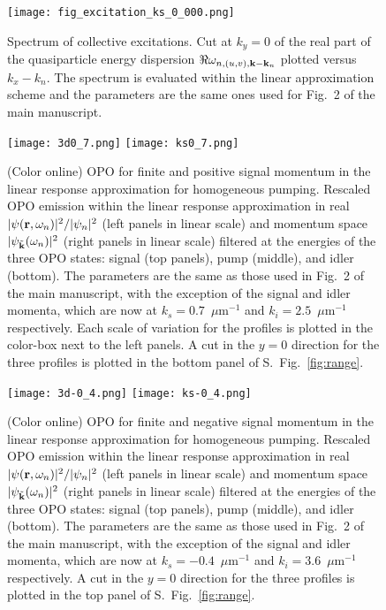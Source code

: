 %
\begin{figure}[h!]
\texttt{[image: fig\_excitation\_ks\_0\_000.png]}
\caption{Spectrum of collective excitations. Cut at $k_y=0$ of the
  real part of the quasiparticle energy dispersion $\Re
  \omega_{n,(u,v),{\mathbf k}-{\mathbf k}_n}$ plotted versus $k_x -
  k_n$. The spectrum is evaluated within the linear approximation
  scheme and the parameters are the same ones used for Fig.~2 of the
  main manuscript.}
\label{fig:bogol}
\end{figure}
%
%
\begin{figure}[h!]
\centering
\texttt{[image: 3d0\_7.png]}
\texttt{[image: ks0\_7.png]}
\caption{(Color online) OPO for finite and positive signal momentum in
  the linear response approximation for homogeneous pumping. Rescaled
  OPO emission within the linear response approximation in real $|\psi
  ({\mathbf r},\omega_n)|^2/|\psi_n|^2$ (left panels in linear scale) and
  momentum space $|\psi_{\tilde{{\mathbf k}}} (\omega_n)|^2$ (right
  panels in linear scale) filtered at the energies of the three OPO
  states: signal (top panels), pump (middle), and idler (bottom). The
  parameters are the same as those used in Fig.~2 of the main
  manuscript, with the exception of the signal and idler momenta,
  which are now at $k_s = 0.7$~$\mu$m$^{-1}$ and $k_i =
  2.5$~$\mu$m$^{-1}$ respectively. Each scale of variation for the
  profiles is plotted in the color-box next to the left panels. A cut
  in the $y=0$ direction for the three profiles is plotted in the
  bottom panel of S.~Fig.~\ref{fig:range}.}
\label{fig:ksp07}
\end{figure}
%
%
\begin{figure}[h!]
\centering
\texttt{[image: 3d-0\_4.png]}
\texttt{[image: ks-0\_4.png]}
\caption{(Color online) OPO for finite and negative signal momentum in
  the linear response approximation for homogeneous pumping. Rescaled
  OPO emission within the linear response approximation in real $|\psi
  ({\mathbf r},\omega_n)|^2/|\psi_n|^2$ (left panels in linear scale) and
  momentum space $|\psi_{\tilde{{\mathbf k}}} (\omega_n)|^2$ (right
  panels in linear scale) filtered at the energies of the three OPO
  states: signal (top panels), pump (middle), and idler (bottom). The
  parameters are the same as those used in Fig.~2 of the main
  manuscript, with the exception of the signal and idler momenta,
  which are now at $k_s = -0.4$~$\mu$m$^{-1}$ and $k_i =
  3.6$~$\mu$m$^{-1}$ respectively. A cut in the $y=0$ direction for
  the three profiles is plotted in the top panel of
  S.~Fig.~\ref{fig:range}.}
\label{fig:ksm04}
\end{figure}
